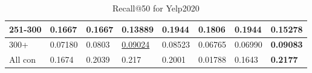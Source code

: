 \begin{table*}[]
\begin{tabular}{|l|l|l|l|l|l|l||l|}
        251-300     & 0.1667                         & 0.1667                         & 0.13889                        & \textbf{0.1944}                & 0.1806                         & \textbf{0.1944}                 & 0.15278                    \\ \hline
        300+        & 0.07180                        & 0.0803                         & \underline{0.09024}            & 0.08523                        & 0.06765                        & 0.06990                         & \textbf{0.09083}           \\ \hline
        All con     & 0.1674                         & 0.2039                         & 0.217                          & 0.2001                         & 0.01788                        & 0.1643                          & \textbf{0.2177}            \\ \hline
    \end{tabular}
    \caption{Recall@50 for Yelp2020}
    \label{tab:yelp2020-recall-evaluation}
\end{table*}

